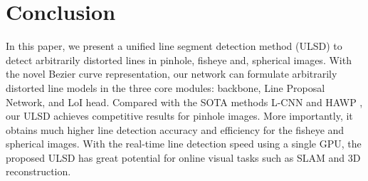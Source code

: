 \documentclass[letterpaper, 10 pt, conference]{ieeeconf}
\begin{document}
\section{Conclusion} \label{sec5}
In this paper, we present a unified line segment detection method (ULSD) to detect arbitrarily distorted lines in pinhole, fisheye and, spherical images. With the novel Bezier curve representation, our network can formulate arbitrarily distorted line models in the three core modules: backbone, Line Proposal Network, and LoI head. Compared with the SOTA methods L-CNN \cite{LCNN} and HAWP \cite{HAWP}, our ULSD achieves competitive results for pinhole images. More importantly, it obtains much higher line detection accuracy and efficiency for the fisheye and spherical images. With the real-time line detection speed using a single GPU, the proposed ULSD has great potential for online visual tasks such as SLAM and 3D reconstruction. 



\end{document}
